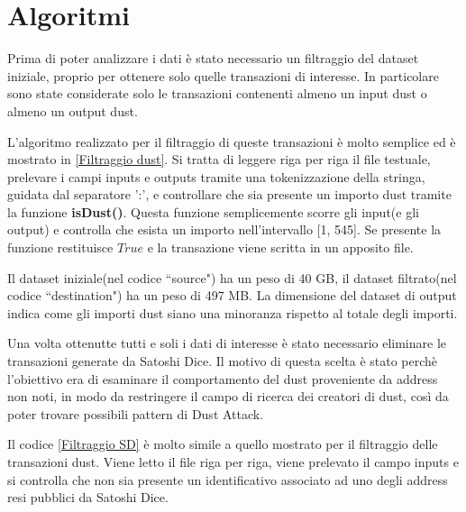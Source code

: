 \section{Algoritmi}
Prima di poter analizzare i dati è stato necessario un filtraggio del dataset iniziale, proprio per ottenere solo quelle transazioni di interesse. In particolare sono state considerate solo le transazioni contenenti almeno un input dust o almeno un output dust. 

L'algoritmo realizzato per il filtraggio di queste transazioni è molto semplice ed è mostrato in \ref{Filtraggio dust}. Si tratta di leggere riga per riga il file testuale, prelevare i campi inputs e outputs tramite una tokenizzazione della stringa, guidata dal separatore ':', e controllare che sia presente un importo dust tramite la funzione \textbf{isDust()}. Questa funzione semplicemente scorre gli input(e gli output) e controlla che esista un importo nell'intervallo [1, 545]. Se presente la funzione restituisce $True$ e la transazione viene scritta in un apposito file.

Il dataset iniziale(nel codice ``source") ha un peso di 40 GB, il dataset filtrato(nel codice ``destination") ha un peso di 497 MB. La dimensione del dataset di output indica come gli importi dust siano una minoranza rispetto al totale degli importi.

Una volta ottenutte tutti e soli i dati di interesse è stato necessario eliminare le transazioni generate da Satoshi Dice. Il motivo di questa scelta è stato perchè l'obiettivo era di esaminare il comportamento del dust proveniente da address non noti, in modo da restringere il campo di ricerca dei creatori di dust, così da poter trovare possibili pattern di Dust Attack.

Il codice \ref{Filtraggio SD} è molto simile a quello mostrato per il filtraggio delle transazioni dust. Viene letto il file riga per riga, viene prelevato il campo inputs e si controlla che non sia presente un identificativo associato ad uno degli address resi pubblici da Satoshi Dice. 

